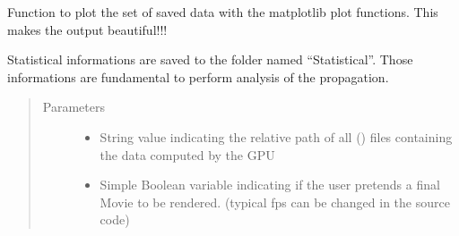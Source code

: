 \documentclass[letterpaper,10pt,english]{sphinxmanual}
\begin{document}
\begin{fulllineitems}

\begin{fulllineitems}
\label{\detokenize{index:Loader.meshPlot.plot_sequence}}
Function to plot the set of saved data with the matplotlib
plot functions. This makes the output beautiful!!!

Statistical informations are saved to the folder named “Statistical”.
Those informations are fundamental to perform analysis of the propagation.
\begin{quote}\begin{description}
\item[{Parameters}] \leavevmode\begin{itemize}
\item {} 
 \textendash{} String value indicating the relative path of all  () files containing the data computed by the GPU

\item {} 
 \textendash{} Simple Boolean variable indicating if the user pretends a final Movie to be rendered. (typical fps can be changed in the source code)

\end{itemize}

\end{description}\end{quote}

\end{fulllineitems}


\end{fulllineitems}




\renewcommand{\indexname}{Index}
\printindex
\end{document}
